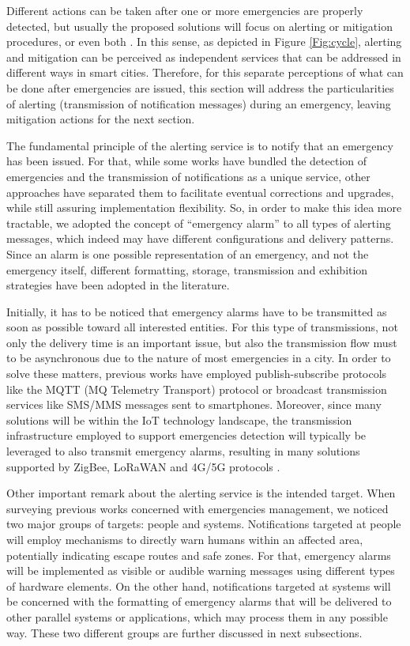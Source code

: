 \begin{refsection}
Different actions can be taken after one or more emergencies are properly detected, but usually the proposed solutions will focus on alerting or mitigation procedures, or even both \cite{architecture1,emergenciesmetric2}. In this sense, as depicted in Figure \ref{Fig:cycle}, alerting and mitigation can be perceived as independent services that can be addressed in different ways in smart cities. Therefore, for this separate perceptions of what can be done after emergencies are issued, this section will address the particularities of alerting (transmission of notification messages) during an emergency, leaving mitigation actions for the next section. 

The fundamental principle of the alerting service is to notify that an emergency has been issued. For that, while some works have bundled the detection of emergencies and the transmission of notifications as a unique service, other approaches have separated them to facilitate eventual corrections and upgrades, while still assuring implementation flexibility. So, in order to make this idea more tractable, we adopted the concept of ``emergency alarm'' to all types of alerting messages, which indeed may have different configurations and delivery patterns. Since an alarm is one possible representation of an emergency, and not the emergency itself, different formatting, storage, transmission and exhibition strategies have been adopted in the literature.

Initially, it has to be noticed that emergency alarms have to be transmitted as soon as possible toward all interested entities. For this type of transmissions, not only the delivery time is an important issue, but also the transmission flow must to be asynchronous due to the nature of most emergencies in a city. In order to solve these matters, previous works have employed publish-subscribe protocols like the MQTT (MQ Telemetry Transport) protocol or broadcast transmission services like SMS/MMS messages sent to smartphones. Moreover, since many solutions will be within the IoT technology landscape, the transmission infrastructure employed to support emergencies detection will typically be leveraged to also transmit emergency alarms, resulting in many solutions supported by ZigBee, LoRaWAN and 4G/5G protocols \cite{protocolsiot1,protocolsiot2}.

Other important remark about the alerting service is the intended target. When surveying previous works concerned with emergencies management, we noticed two major groups of targets: people and systems. Notifications targeted at people will employ mechanisms to directly warn humans within an affected area, potentially indicating escape routes and safe zones. For that, emergency alarms will be implemented as visible or audible warning messages using different types of hardware elements. On the other hand, notifications targeted at systems will be concerned with the formatting of emergency alarms that will be delivered to other parallel systems or applications, which may process them in any possible way. These two different groups are further discussed in next subsections.


\end{refsection}
